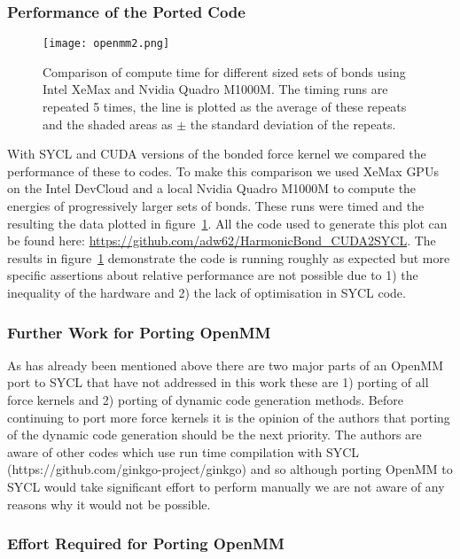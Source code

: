 \subsubsection{Performance of the Ported Code}\label{sec:openmm_performance}

\begin{figure}
	\caption{Comparison of compute time for different sized sets of bonds using Intel XeMax and Nvidia Quadro M1000M. The timing runs are repeated 5 times, the line is plotted as the average of these repeats and the shaded areas as $\pm$ the standard deviation of the repeats.}
	\texttt{[image: openmm2.png]}
	\label{fig:openmm}
\end{figure}

With SYCL and CUDA versions of the bonded force kernel we compared the performance of these to codes.
To make this comparison we used XeMax GPUs on the Intel DevCloud and a local Nvidia Quadro M1000M to compute the energies of progressively larger sets of bonds.
These runs were timed and the resulting the data plotted in figure~\ref{fig:openmm}.
All the code used to generate this plot can be found here: \url{https://github.com/adw62/HarmonicBond_CUDA2SYCL}. The results in figure~\ref{fig:openmm} demonstrate the code is running roughly as expected but more specific assertions about relative performance are not possible due to 1) the inequality of the hardware and 2) the lack of optimisation in SYCL code.

\subsubsection{Further Work for Porting OpenMM}\label{sec:openmm_furtherwork}

As has already been mentioned above there are two major parts of an OpenMM port to SYCL that have not addressed in this work these are 1) porting of all force kernels and 2) porting of dynamic code generation methods.
Before continuing to port more force kernels it is the opinion of the authors that porting of the dynamic code generation should be the next priority. The authors are aware of other codes which use run time compilation with SYCL (https://github.com/ginkgo-project/ginkgo) and so although porting OpenMM to SYCL would take significant effort to perform manually we are not aware of any reasons why it would not be possible.


\subsubsection{Effort Required for Porting OpenMM}\label{sec:openmm_effort}

